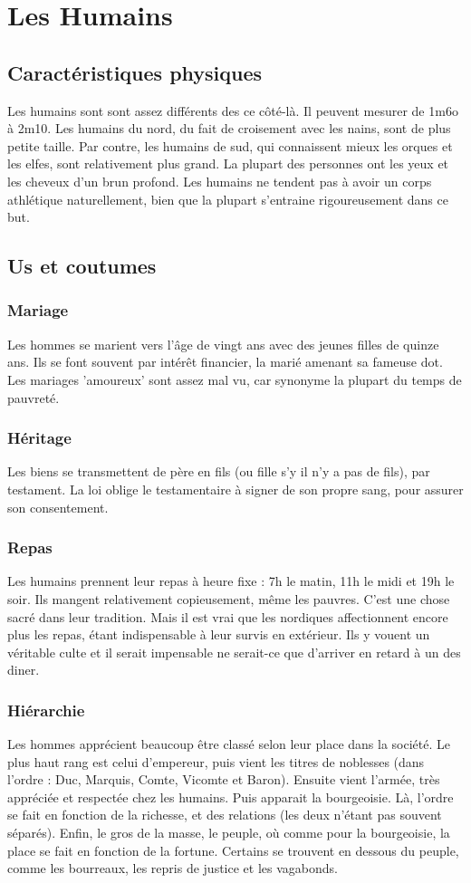 \section{Les Humains}
\subsection{Caractéristiques physiques}
Les humains sont sont assez différents des ce côté-là. Il peuvent mesurer de 1m6o à 2m10. Les humains du nord, du fait de croisement avec les nains, sont de plus petite taille. Par contre, les humains de sud, qui connaissent mieux les orques et les elfes, sont relativement plus grand. La plupart des personnes ont les yeux et les cheveux d’un brun profond. Les humains ne tendent pas à avoir un corps athlétique naturellement, bien que la plupart s’entraine rigoureusement dans ce but. 
\subsection{Us et coutumes}
\subsubsection{Mariage}
Les hommes se marient vers l’âge de vingt ans avec des jeunes filles de quinze ans. Ils se font souvent par intérêt financier, la marié amenant sa fameuse dot. Les mariages ’amoureux’ sont assez mal vu, car synonyme la plupart du temps de pauvreté. 
\subsubsection{Héritage}
Les biens se transmettent de père en fils (ou fille s’y il n’y a pas de fils), par testament. La loi oblige le testamentaire à signer de son propre sang, pour assurer son consentement. 
\subsubsection{Repas}
Les humains prennent leur repas à heure fixe : 7h le matin, 11h le midi et 19h le soir. Ils mangent relativement copieusement, même les pauvres. C’est une chose sacré dans leur tradition. Mais il est vrai que les nordiques affectionnent encore plus les repas, étant indispensable à leur survis en extérieur. Ils y vouent un véritable culte et il serait impensable ne serait-ce que d'arriver en retard à un des diner. 
\subsubsection{Hiérarchie}
Les hommes apprécient beaucoup être classé selon leur place dans la société. Le plus haut rang est celui d’empereur, puis vient les titres de noblesses (dans l’ordre : Duc, Marquis, Comte, Vicomte et Baron). Ensuite vient l’armée, très appréciée et respectée chez les humains. Puis apparait la bourgeoisie. Là, l’ordre se fait en fonction de la richesse, et des relations (les deux n’étant pas souvent séparés). Enfin, le gros de la masse, le peuple, où comme pour la bourgeoisie, la place se fait en fonction de la fortune. Certains se trouvent en dessous du peuple, comme les bourreaux, les repris de justice et les vagabonds. 
